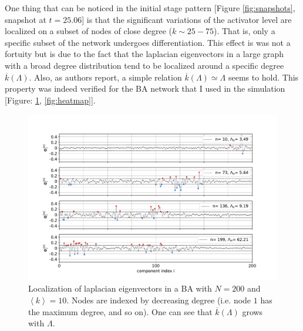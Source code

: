 One thing that can be noticed in the initial stage pattern [Figure \ref{fig:snapshots}, snapshot at $t = 25.06$] is that the significant variations of the activator level are localized on a subset of nodes of close degree ($k \sim 25-75$). That is, only a specific subset of the network undergoes differentiation. This effect is was not a fortuity but is due to the fact that the laplacian eigenvectors in a large graph with a broad degree distribution tend to be localized around a specific degree $\overline{k}(\Lambda)$. Also, as authors report, a simple relation $\overline{k}(\Lambda) \simeq \Lambda$ seems to hold. This property was indeed verified for the BA network that I used in the simulation [Figure: \ref{fig:eigenvectors}, \ref{fig:heatmap}].
\begin{figure}[H]
\centering
\includegraphics[width =\textwidth]{latex_source/images/turing/eigenvectors_200.pdf}
\caption{Localization of laplacian eigenvectors in 
a BA with $N=200$ and $\left \langle k \right \rangle = 10$. Nodes are indexed by decreasing degree (i.e. node $1$ has the maximum degree, and so on). One can see that  $\overline{k}(\Lambda)$ grows with $\Lambda$.}
\label{fig:eigenvectors}
\end{figure}

